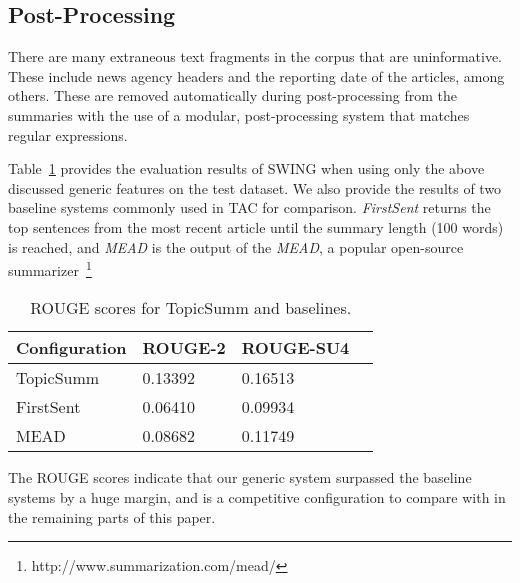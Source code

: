 \subsection{Post-Processing}
There are many extraneous text fragments in the corpus that are uninformative. These include news agency headers and the reporting date of the articles, among others. 
These are removed automatically during post-processing from the summaries with the use of a modular, post-processing system that matches regular expressions.

Table~\ref{table:automated_eval_generic} provides the evaluation results of %
SWING
when using only the above discussed generic features on the test dataset. We also provide the results of two baseline systems commonly used in TAC for comparison. \textit{FirstSent} returns the top sentences from the most recent article until the summary length (100 words) is reached, and \textit{MEAD} is the output of the \textit{MEAD}, a popular open-source summarizer~\footnote{http://www.summarization.com/mead/}

\begin{table}[h]
\centering
\begin{tabular}{l||l|l|l}
Configuration & ROUGE-2 & ROUGE-SU4  \\ \hline
TopicSumm     & 0.13392   & 0.16513  \\
FirstSent & 0.06410   & 0.09934 \\
MEAD & 0.08682   & 0.11749 \\
\end{tabular}
\caption{ROUGE scores for TopicSumm and baselines.}
\label{table:automated_eval_generic}
\end{table}

The ROUGE scores indicate that our generic system 
surpassed the baseline systems by a huge margin, and is a competitive configuration to compare with in the remaining parts of this paper.
